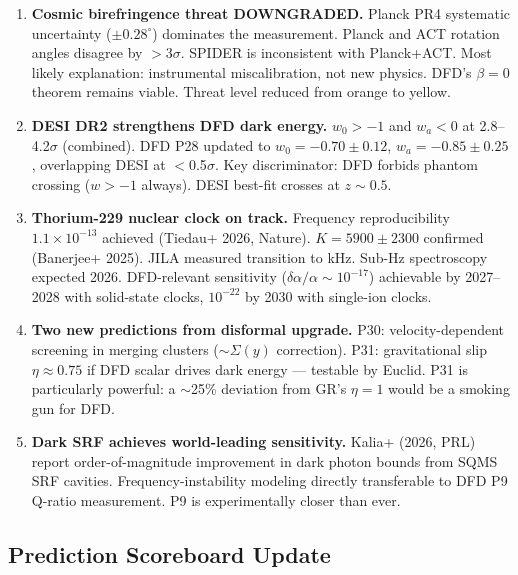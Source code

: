 \documentclass[11pt,a4paper]{article}
\begin{document}
\begin{enumerate}

\item \textbf{Cosmic birefringence threat DOWNGRADED.} Planck PR4 systematic uncertainty ($\pm 0.28^\circ$) dominates the measurement. Planck and ACT rotation angles disagree by $>$3$\sigma$. SPIDER is inconsistent with Planck+ACT. Most likely explanation: instrumental miscalibration, not new physics. DFD's $\beta = 0$ theorem remains viable. Threat level reduced from orange to yellow.

\item \textbf{DESI DR2 strengthens DFD dark energy.} $w_0 > -1$ and $w_a < 0$ at 2.8--4.2$\sigma$ (combined). DFD P28 updated to $w_0 = -0.70 \pm 0.12$, $w_a = -0.85 \pm 0.25$, overlapping DESI at $<$0.5$\sigma$. Key discriminator: DFD forbids phantom crossing ($w > -1$ always). DESI best-fit crosses at $z \sim 0.5$.

\item \textbf{Thorium-229 nuclear clock on track.} Frequency reproducibility $1.1\times10^{-13}$ achieved (Tiedau+ 2026, Nature). $K = 5900 \pm 2300$ confirmed (Banerjee+ 2025). JILA measured transition to kHz. Sub-Hz spectroscopy expected 2026. DFD-relevant sensitivity ($\delta\alpha/\alpha \sim 10^{-17}$) achievable by 2027--2028 with solid-state clocks, $10^{-22}$ by 2030 with single-ion clocks.

\item \textbf{Two new predictions from disformal upgrade.} P30: velocity-dependent screening in merging clusters ($\sim$$\Sigma(y)$ correction). P31: gravitational slip $\eta \approx 0.75$ if DFD scalar drives dark energy --- testable by Euclid. P31 is particularly powerful: a $\sim$25\% deviation from GR's $\eta = 1$ would be a smoking gun for DFD.

\item \textbf{Dark SRF achieves world-leading sensitivity.} Kalia+ (2026, PRL) report order-of-magnitude improvement in dark photon bounds from SQMS SRF cavities. Frequency-instability modeling directly transferable to DFD P9 Q-ratio measurement. P9 is experimentally closer than ever.

\end{enumerate}

\subsection{Prediction Scoreboard Update}
\end{document}
